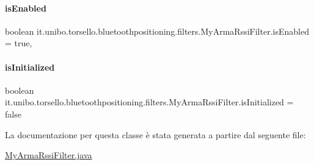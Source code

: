 \hypertarget{classit_1_1unibo_1_1torsello_1_1bluetoothpositioning_1_1filters_1_1MyArmaRssiFilter_abff3147d8a5700ce103cd355d7b2b7d7_abff3147d8a5700ce103cd355d7b2b7d7}{}\label{classit_1_1unibo_1_1torsello_1_1bluetoothpositioning_1_1filters_1_1MyArmaRssiFilter_abff3147d8a5700ce103cd355d7b2b7d7_abff3147d8a5700ce103cd355d7b2b7d7} 
\paragraph{\texorpdfstring{is\+Enabled}{isEnabled}}
{\footnotesize\ttfamily boolean it.\+unibo.\+torsello.\+bluetoothpositioning.\+filters.\+My\+Arma\+Rssi\+Filter.\+is\+Enabled = true\hspace{0.3cm}{\ttfamily [static]}, {\ttfamily [private]}}

\hypertarget{classit_1_1unibo_1_1torsello_1_1bluetoothpositioning_1_1filters_1_1MyArmaRssiFilter_a77ff83671b040ea636a1bb939803450b_a77ff83671b040ea636a1bb939803450b}{}\label{classit_1_1unibo_1_1torsello_1_1bluetoothpositioning_1_1filters_1_1MyArmaRssiFilter_a77ff83671b040ea636a1bb939803450b_a77ff83671b040ea636a1bb939803450b} 
\paragraph{\texorpdfstring{is\+Initialized}{isInitialized}}
{\footnotesize\ttfamily boolean it.\+unibo.\+torsello.\+bluetoothpositioning.\+filters.\+My\+Arma\+Rssi\+Filter.\+is\+Initialized = false\hspace{0.3cm}{\ttfamily [private]}}



La documentazione per questa classe è stata generata a partire dal seguente file\+:\begin{DoxyCompactItemize}
\item 
\hyperlink{MyArmaRssiFilter_8java}{My\+Arma\+Rssi\+Filter.\+java}\end{DoxyCompactItemize}
